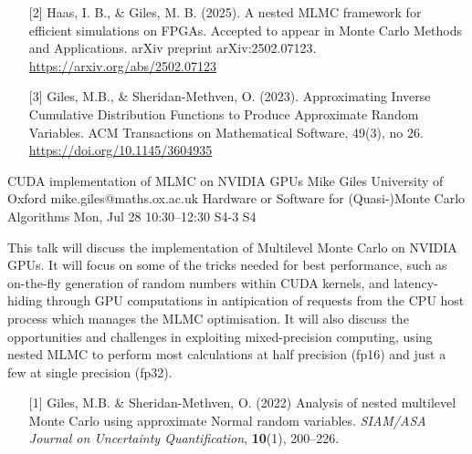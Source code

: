 \begin{talk}
\begin{enumerate}
    \item[{[2]}] Haas, I. B., \& Giles, M. B. (2025). A nested MLMC framework for efficient simulations on FPGAs. Accepted to appear in Monte Carlo Methods and Applications. arXiv preprint arXiv:2502.07123. \url{https://arxiv.org/abs/2502.07123}

     \item[{[3]}] Giles, M.B., \& Sheridan-Methven, O. (2023). Approximating Inverse Cumulative Distribution Functions to Produce Approximate Random Variables. ACM Transactions on Mathematical Software, 49(3), no 26. \url{https://doi.org/10.1145/3604935}
\end{enumerate}

\end{talk}

\begin{talk}
  {CUDA implementation of MLMC on NVIDIA GPUs}%
  {Mike Giles}%
  {University of Oxford}%
  {mike.giles@maths.ox.ac.uk}%
  {Hardware or Software for (Quasi-)Monte Carlo Algorithms}%
  {}%
  {Mon, Jul 28 10:30–12:30}%
  {S4-3}%
  {S4}%
				
			

This talk will discuss the implementation of Multilevel Monte Carlo
on NVIDIA GPUs.  It will focus on some of the tricks needed for best
performance, such as on-the-fly generation of random numbers within
CUDA kernels, and latency-hiding through GPU computations in antipication
of requests from the CPU host process which manages the MLMC optimisation.
It will also discuss the opportunities and challenges in exploiting
mixed-precision computing, using nested MLMC to perform most calculations
at half precision (fp16) and just a few at single precision (fp32).

\medskip

\begin{enumerate}
\item[{[1]}] Giles, M.B. \& Sheridan-Methven, O. (2022)
  Analysis of nested multilevel Monte Carlo using approximate
  Normal random variables. {\it SIAM/ASA
Journal on Uncertainty Quantification}, \textbf{10}(1), 200--226.
\end{enumerate}

\end{talk}

